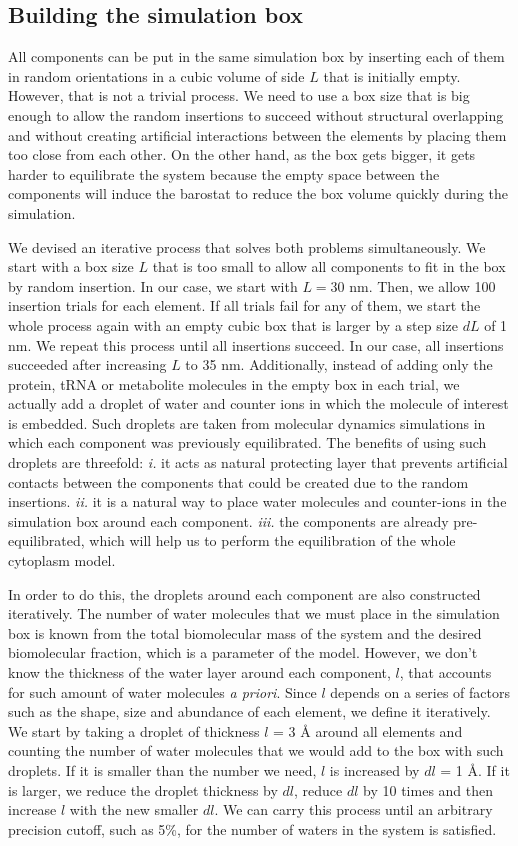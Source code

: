 \documentclass[journal=jacsat,manuscript=article]{achemso}
\begin{document}
\subsection{Building the simulation box}
All components can be put in the same simulation box by inserting each of them in random orientations in a cubic volume of side $L$ that is initially empty. However, that is not a trivial process. We need to use a box size that is big enough to allow the random insertions to succeed without structural overlapping and without creating artificial interactions between the elements by placing them too close from each other. On the other hand, as the box gets bigger, it gets harder to equilibrate the system because the empty space between the components will induce the barostat to reduce the box volume quickly during the simulation.

We devised an iterative process that solves both problems simultaneously. We start with a box size $L$ that is too small to allow all components to fit in the box by random insertion. In our case, we start with $L = 30$ nm. Then, we allow 100 insertion trials for each element. If all trials fail for any of them, we start the whole process again with an empty cubic box that is larger by a step size $dL$ of 1 nm. We repeat this process until all insertions succeed. In our case, all insertions succeeded after increasing $L$ to 35 nm. Additionally, instead of adding only the protein, tRNA or metabolite molecules in the empty box in each trial, we actually add a droplet of water and counter ions in which the molecule of interest is embedded. Such droplets are taken from molecular dynamics simulations in which each component was previously equilibrated. The benefits of using such droplets are threefold: \textit{i.} it acts as natural protecting layer that prevents artificial contacts between the components that could be created due to the random insertions. \textit{ii.} it is a natural way to place water molecules and counter-ions in the simulation box around each component. \textit{iii.} the components are already pre-equilibrated, which will help us to perform the equilibration of the whole cytoplasm model.

In order to do this, the droplets around each component are also constructed iteratively. The number of water molecules that we must place in the simulation box is known from the total biomolecular mass of the system and the desired biomolecular fraction, which is a parameter of the model. However, we don't know the thickness of the water layer around each component, $l$, that accounts for such amount of water molecules \textit{a priori}. Since $l$ depends on a series of factors such as the shape, size and abundance of each element, we define it iteratively. We start by taking a droplet of thickness $l$ = 3 \r{A} around all elements and counting the number of water molecules that we would add to the box with such droplets. If it is smaller than the number we need, $l$ is increased by $dl$ = 1 \r{A}. If it is larger, we reduce the droplet thickness by $dl$, reduce $dl$ by 10 times and then increase $l$ with the new smaller $dl$. We can carry this process until an arbitrary precision cutoff, such as 5\%, for the number of waters in the system is satisfied.
\end{document}
